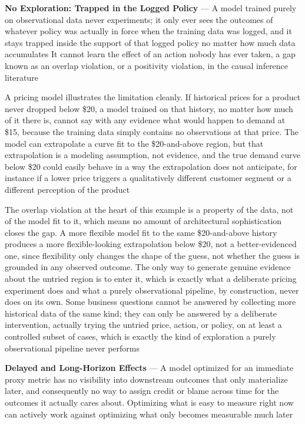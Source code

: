 \textbf{No Exploration: Trapped in the Logged Policy} --- A model trained purely
on observational data never experiments; it only ever sees the outcomes of
whatever policy was actually in force when the training data was logged, and it stays
trapped inside the support of that logged policy no matter how much data accumulates
It cannot learn the effect of an action nobody has ever taken, a gap known as an
overlap violation, or a positivity violation, in the causal inference literature

A pricing model illustrates the limitation cleanly. If historical prices for a product
never dropped below \$20, a model trained on that history, no matter how much of
it there is, cannot say with any evidence what would happen to demand at \$15, because
the training data simply contains no observations at that price. The model can
extrapolate a curve fit to the \$20-and-above region, but that extrapolation is
a modeling assumption, not evidence, and the true demand curve below \$20 could easily
behave in a way the extrapolation does not anticipate, for instance if a lower
price triggers a qualitatively different customer segment or a different
perception of the product

The overlap violation at the heart of this example is a property of the data,
not of the model fit to it, which means no amount of architectural sophistication
closes the gap. A more flexible model fit to the same \$20-and-above history produces
a more flexible-looking extrapolation below \$20, not a better-evidenced one,
since flexibility only changes the shape of the guess, not whether the guess is grounded
in any observed outcome. The only way to generate genuine evidence about the
untried region is to enter it, which is exactly what a deliberate pricing experiment
does and what a purely observational pipeline, by construction, never does on its
own. Some business questions cannot be answered by collecting more historical
data of the same kind; they can only be answered by a deliberate intervention,
actually trying the untried price, action, or policy, on at least a controlled subset
of cases, which is exactly the kind of exploration a purely observational
pipeline never performs

\textbf{Delayed and Long-Horizon Effects} --- A model optimized for an immediate
proxy metric has no visibility into downstream outcomes that only materialize
later, and consequently no way to assign credit or blame across time for the outcomes
it actually cares about. Optimizing what is easy to measure right now can
actively work against optimizing what only becomes measurable much later

